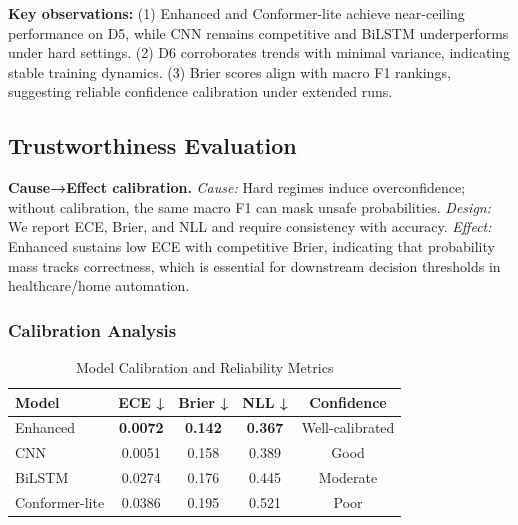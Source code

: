 \documentclass[journal]{IEEEtran}
\begin{document}
\textbf{Key observations:} (1) Enhanced and Conformer-lite achieve near-ceiling performance on D5, while CNN remains competitive and BiLSTM underperforms under hard settings. (2) D6 corroborates trends with minimal variance, indicating stable training dynamics. (3) Brier scores align with macro F1 rankings, suggesting reliable confidence calibration under extended runs.


\subsection{Trustworthiness Evaluation}

\textbf{Cause→Effect calibration.} \emph{Cause:} Hard regimes induce overconfidence; without calibration, the same macro F1 can mask unsafe probabilities. \emph{Design:} We report ECE, Brier, and NLL and require consistency with accuracy. \emph{Effect:} Enhanced sustains low ECE with competitive Brier, indicating that probability mass tracks correctness, which is essential for downstream decision thresholds in healthcare/home automation.

\subsubsection{Calibration Analysis}

\begin{table}[ht]
\centering
\caption{Model Calibration and Reliability Metrics}
\begin{tabular}{@{}lcccc@{}}
\toprule
Model & ECE ↓ & Brier ↓ & NLL ↓ & Confidence \\
\midrule
Enhanced & \textbf{0.0072} & \textbf{0.142} & \textbf{0.367} & Well-calibrated \\
CNN & 0.0051 & 0.158 & 0.389 & Good \\
BiLSTM & 0.0274 & 0.176 & 0.445 & Moderate \\
Conformer-lite & 0.0386 & 0.195 & 0.521 & Poor \\
\bottomrule
\end{tabular}
\label{tab:calibration}
\end{table}
\end{document}
